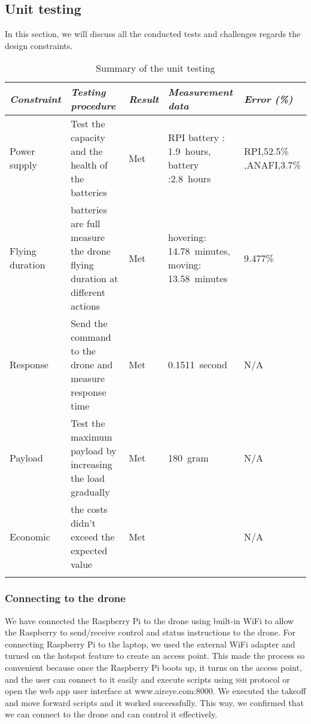\documentclass[../main.tex]{subfiles}
\begin{document}
\subsection{Unit testing}
In this section, we will discuss all the conducted tests 
and challenges regards the design constraints. 
\begin{table}[H]
	\centering
	\caption{Summary of the unit testing}
	\label{tab:unit-testing-summary}
	\begin{tabularx}{\textwidth}{ X X l X l }
		\toprule
		\textit{Constraint} 
		& \textit{Testing procedure} 
		& \textit{Result}
		& \textit{Measurement data} 
		& \textit{Error (\%)} \\
		
		\midrule
		
		
		\raggedright Power supply    
		& Test the capacity and the health of the batteries
		& Met
		& RPI battery : \SI{1.9}{hours}, \anafi battery :\SI{2.8}{hours}
		& RPI,52.5\%
		,ANAFI,3.7\% \\
		\addlinespace
		
		\raggedright Flying duration
		& batteries are full measure the drone flying duration at different actions
		& Met
		& hovering: \SI{14.78}{minutes},		moving: \SI{13.58}{minutes} 
		& 9.477\%\\
		\addlinespace
		
		\raggedright Response    
		& Send the command to the drone and measure response time
		& Met
		& \SI{0.1511}{second}
		& N/A \\
		\addlinespace

		\raggedright Payload     
		& Test the maximum payload by increasing the load gradually
		& Met
		& \SI{180}{gram}
		& N/A \\
		\addlinespace
		
		\raggedright Economic     
		& the costs didn't exceed the expected value 
		& Met
		& \qar{3800}
		& N/A \\
		\addlinespace		
		\bottomrule		
	\end{tabularx}
\end{table}
\subsubsection{Connecting to the drone}

We have connected the
Raspberry Pi to the drone using built-in WiFi
to allow the Raspberry to send/receive control and status 
instructions to the drone. 
For connecting Raspberry Pi to the laptop, 
we used the external WiFi adapter and turned 
on the hotspot feature to create an access point.
This made the process so convenient because 
once the Raspberry Pi boots up, it turns on the 
access point, and the user can connect to it 
easily and execute scripts using \textsc{ssh} 
protocol or open the web app user interface 
at www.aireye.com:8000. We executed the takeoff 
and move forward scripts and it worked successfully.
This way, we confirmed that we can connect to the drone and can control it effectively.
\end{document}
